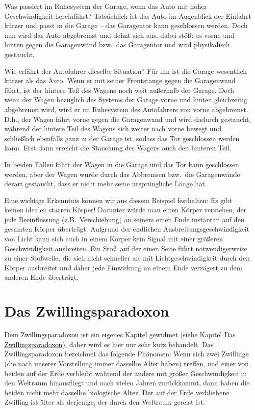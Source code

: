 Was passiert im Ruhesystem
der Garage, wenn das Auto mit hoher
Geschwindigkeit hereinf\"ahrt? Tats\"achlich
ist das Auto im Augenblick der Einfahrt
k\"urzer und passt in die Garage -- das
Garagentor kann geschlossen werden. Doch 
nun wird das Auto abgebremst und dehnt sich
aus, dabei st\"o\ss t es vorne und hinten
gegen die Garagenwand bzw.\ das
Garagentor und wird physikalisch gestaucht.

Wie erf\"ahrt der Autofahrer dieselbe
Situation? F\"ur ihn ist die Garage
wesentlich k\"urzer als das Auto. Wenn er
mit seiner Frontstange gegen die Garagenwand
f\"ahrt, ist der hintere Teil des Wagens noch
weit au\ss erhalb der Garage. Doch wenn
der Wagen bez\"uglich des Systems der
Garage vorne und hinten gleichzeitig
abgebremst wird, wird er im Ruhesystem
des Autofahrers von vorne abgebremst.
D.h., der Wagen f\"ahrt vorne gegen die
Garagenwand und wird dadurch gestaucht,
w\"ahrend der hintere Teil des Wagens
sich weiter nach vorne bewegt und
schlie\ss lich ebenfalls ganz in der
Garage ist, sodass das Tor geschlossen
werden kann. Erst dann erreicht die
Stauchung des Wagens auch den hinteren
Teil.

In beiden F\"allen f\"ahrt der Wagen 
in die Garage und das Tor kann geschlossen
werden, aber der Wagen wurde durch das
Abbremsen bzw.\ die Garagenw\"ande
derart gestaucht, dass er nicht mehr seine
urspr\"ungliche L\"ange hat. 

Eine wichtige Erkenntnis k\"onnen
wir aus diesem Beispiel festhalten:
Es gibt keinen idealen starren K\"orper!
Darunter w\"urde man einen K\"orper
verstehen, der jede Beeinflussung
(z.B.\ Verschiebung) an seinem einen
Ende instantan auf den gesamten 
K\"orper \"ubertr\"agt. Aufgrund der
endlichen Ausbreitungsgeschwindigkeit
von Licht kann sich auch in einem
K\"orper kein Signal mit einer gr\"o\ss eren
Geschwindigkeit ausbreiten. Ein Sto\ss\
auf der einen Seite f\"uhrt notwendigerweise
zu einer Sto\ss welle, die sich nicht
schneller als mit Lichtgeschwindigkeit
durch den K\"orper ausbreitet und
daher jede Einwirkung an einem
Ende verz\"ogert zu dem anderen Ende \"ubertr\"agt.

\section{Das Zwillingsparadoxon}
\label{sec_twin}

Dem Zwillingsparadoxon ist ein eigenes Kapitel gewidmet 
(siehe Kapitel \hyperref[chap_Zwilling]{Das Zwillingsparadoxon}),
daher wird es hier nur sehr kurz behandelt. Das Zwillingsparadoxon bezeichnet das
folgende Ph\"anomen: Wenn sich zwei Zwillinge
(die nach unserer Vorstellung immer
dasselbe Alter haben) treffen, und einer
von beiden auf der Erde verbleibt w\"ahrend
der andere mit gro\ss er Geschwindigkeit
in den Weltraum hinausfliegt und nach
vielen Jahren zur\"uckkommt, dann
haben die beiden nicht mehr dasselbe
biologische Alter. Der auf der Erde
verbliebene Zwilling ist \"alter als
derjenige, der durch den Weltraum
gereist ist. 

